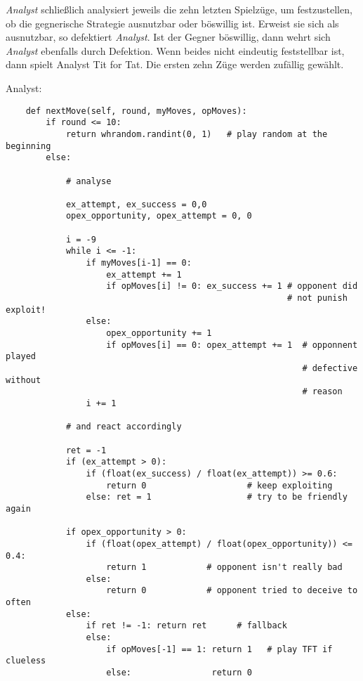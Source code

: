 \documentclass[12pt,a4paper,ngerman]{article}
\begin{document}
{\em Analyst} schließlich analysiert jeweils die zehn letzten Spielzüge, um
festzustellen, ob die gegnerische Strategie ausnutzbar oder böswillig
ist. Erweist sie sich als ausnutzbar, so defektiert {\em Analyst}. Ist der
Gegner böswillig, dann wehrt sich {\em Analyst} ebenfalls durch
Defektion. Wenn beides nicht eindeutig feststellbar ist, dann spielt Analyst
Tit for Tat. Die ersten zehn Züge werden zufällig gewählt.

\begin{scriptsize}
\begin{center}Analyst:\end{center}
\begin{verbatim}
    def nextMove(self, round, myMoves, opMoves):
        if round <= 10:
            return whrandom.randint(0, 1)   # play random at the beginning
        else:

            # analyse
            
            ex_attempt, ex_success = 0,0
            opex_opportunity, opex_attempt = 0, 0
            
            i = -9
            while i <= -1:
                if myMoves[i-1] == 0:
                    ex_attempt += 1
                    if opMoves[i] != 0: ex_success += 1 # opponent did
                                                        # not punish exploit!
                else:
                    opex_opportunity += 1
                    if opMoves[i] == 0: opex_attempt += 1  # opponnent played 
                                                           # defective without
                                                           # reason
                i += 1

            # and react accordingly

            ret = -1
            if (ex_attempt > 0):
                if (float(ex_success) / float(ex_attempt)) >= 0.6:
                    return 0                    # keep exploiting
                else: ret = 1                   # try to be friendly again

            if opex_opportunity > 0:
                if (float(opex_attempt) / float(opex_opportunity)) <= 0.4:
                    return 1            # opponent isn't really bad
                else:
                    return 0            # opponent tried to deceive to often
            else:
                if ret != -1: return ret      # fallback
                else:
                    if opMoves[-1] == 1: return 1   # play TFT if clueless
                    else:                return 0
\end{verbatim}
\end{scriptsize}
\end{document}
